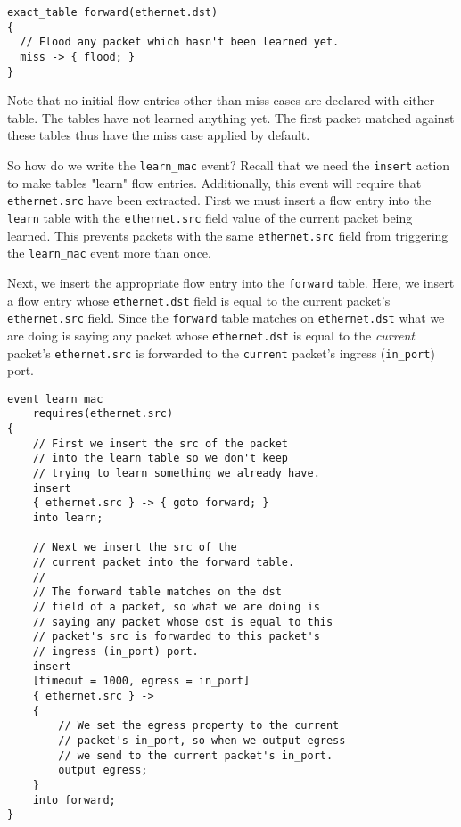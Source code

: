 \begin{lstlisting}
exact_table forward(ethernet.dst)
{
  // Flood any packet which hasn't been learned yet.
  miss -> { flood; }
}
\end{lstlisting}

Note that no initial flow entries other than miss cases are declared with either table. The tables have not learned anything yet. The first packet matched against these tables thus have the miss case applied by default.

So how do we write the \texttt{learn\_mac} event? Recall that we need the \texttt{insert} action to make tables "learn" flow entries. Additionally, this event will require that \texttt{ethernet.src} have been extracted. First we must insert a flow entry into the \texttt{learn} table with the \texttt{ethernet.src} field value of the current packet being learned. This prevents packets with the same \texttt{ethernet.src} field from triggering the \texttt{learn\_mac} event more than once. 

Next, we insert the appropriate flow entry into the \texttt{forward} table. Here, we insert a flow entry whose \texttt{ethernet.dst} field is equal to the current packet's \texttt{ethernet.src} field. Since the \texttt{forward} table matches on \texttt{ethernet.dst} what we are doing is saying any packet whose \texttt{ethernet.dst} is equal to the \textit{current} packet's \texttt{ethernet.src} is forwarded to the \texttt{current} packet's ingress (\texttt{in\_port}) port.

\noindent\begin{minipage}{\linewidth}
\begin{lstlisting}
event learn_mac
	requires(ethernet.src)
{
	// First we insert the src of the packet
	// into the learn table so we don't keep
	// trying to learn something we already have.
	insert
	{ ethernet.src } -> { goto forward; }
	into learn;
	
	// Next we insert the src of the
	// current packet into the forward table.
	//
	// The forward table matches on the dst
	// field of a packet, so what we are doing is
	// saying any packet whose dst is equal to this
	// packet's src is forwarded to this packet's
	// ingress (in_port) port.
	insert
	[timeout = 1000, egress = in_port]
	{ ethernet.src } ->
	{
		// We set the egress property to the current
		// packet's in_port, so when we output egress
		// we send to the current packet's in_port.
		output egress;
	}
	into forward;
}
\end{lstlisting}
\end{minipage}

